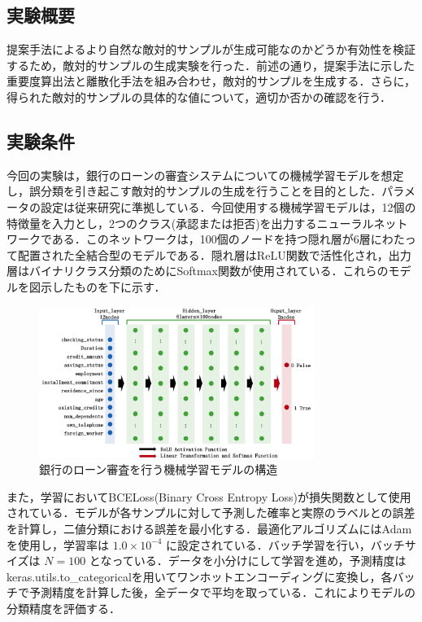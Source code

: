 \subsection{実験概要}
提案手法によるより自然な敵対的サンプルが生成可能なのかどうか有効性を検証するため，敵対的サンプルの生成実験を行った．前述の通り，提案手法に示した重要度算出法と離散化手法を組み合わせ，敵対的サンプルを生成する．さらに，得られた敵対的サンプルの具体的な値について，適切か否かの確認を行う．
\subsection{実験条件}
今回の実験は，銀行のローンの審査システムについての機械学習モデルを想定し，誤分類を引き起こす敵対的サンプルの生成を行うことを目的とした．パラメータの設定は従来研究\cite{ballet2019imperceptible}に準拠している．今回使用する機械学習モデルは，12個の特徴量を入力とし，2つのクラス(承認または拒否)を出力するニューラルネットワークである．このネットワークは，100個のノードを持つ隠れ層が6層にわたって配置された全結合型のモデルである．隠れ層はReLU関数で活性化され，出力層はバイナリクラス分類のためにSoftmax関数が使用されている．これらのモデルを図示したものを下に示す．

\begin{figure}[H]
    \centering
    \includegraphics[width=0.8\textwidth]{images/審査モデル.png}
    \caption{銀行のローン審査を行う機械学習モデルの構造}
    \label{fig:adversarial_example}
\end{figure}

また，学習においてBCELoss(Binary Cross Entropy Loss)が損失関数として使用されている．モデルが各サンプルに対して予測した確率と実際のラベルとの誤差を計算し，二値分類における誤差を最小化する．最適化アルゴリズムにはAdamを使用し，学習率は $1.0 \times 10^{-4}$ に設定されている．バッチ学習を行い，バッチサイズは $N=100$ となっている．データを小分けにして学習を進め，予測精度はkeras.utils.to\_categoricalを用いてワンホットエンコーディングに変換し，各バッチで予測精度を計算した後，全データで平均を取っている．これによりモデルの分類精度を評価する．

